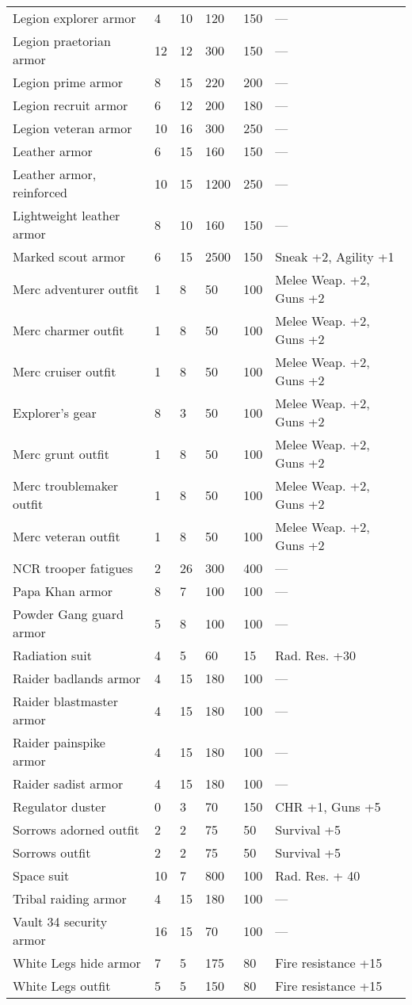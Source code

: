 \begin{longtable}{|p{4cm}|p{1.2cm}|p{1.2cm}|p{1.2cm}|p{1.2cm}|p{4cm}|}
Legion explorer armor  & 4 & 10 & 120 & 150 & —  \\
Legion praetorian armor  & 12 & 12 & 300 & 150 & —  \\
Legion prime armor  & 8 & 15 & 220 & 200 & —  \\
Legion recruit armor  & 6 & 12 & 200 & 180 & —  \\
Legion veteran armor  & 10 & 16 & 300 & 250 & —  \\
Leather armor  & 6 & 15 & 160 & 150 & —  \\
Leather armor, reinforced  & 10 & 15 & 1200 & 250 & —  \\
Lightweight leather armor  & 8 & 10 & 160 & 150 & —  \\
Marked scout armor  & 6 & 15 & 2500 & 150 & Sneak +2, Agility +1  \\
Merc adventurer outfit  & 1 & 8 & 50 & 100 & Melee Weap. +2, Guns +2  \\
Merc charmer outfit  & 1 & 8 & 50 & 100 & Melee Weap. +2, Guns +2  \\
Merc cruiser outfit  & 1 & 8 & 50 & 100 & Melee Weap. +2, Guns +2  \\
Explorer's gear  & 8 & 3 & 50 & 100 & Melee Weap. +2, Guns +2  \\
Merc grunt outfit  & 1 & 8 & 50 & 100 & Melee Weap. +2, Guns +2  \\
Merc troublemaker outfit  & 1 & 8 & 50 & 100 & Melee Weap. +2, Guns +2  \\
Merc veteran outfit  & 1 & 8 & 50 & 100 & Melee Weap. +2, Guns +2  \\
NCR trooper fatigues  & 2 & 26 & 300 & 400 & —  \\
Papa Khan armor  & 8 & 7 & 100 & 100 & —  \\
Powder Gang guard armor  & 5 & 8 & 100 & 100 & —  \\
Radiation suit  & 4 & 5 & 60 & 15 & Rad. Res. +30  \\
Raider badlands armor  & 4 & 15 & 180 & 100 & —  \\
Raider blastmaster armor  & 4 & 15 & 180 & 100 & —  \\
Raider painspike armor  & 4 & 15 & 180 & 100 & —  \\
Raider sadist armor  & 4 & 15 & 180 & 100 & —  \\
Regulator duster  & 0 & 3 & 70 & 150 & CHR +1, Guns +5  \\
Sorrows adorned outfit  & 2 & 2 & 75 & 50 & Survival +5  \\
Sorrows outfit  & 2 & 2 & 75 & 50 & Survival +5  \\
Space suit  & 10 & 7 & 800 & 100 & Rad. Res. + 40  \\
Tribal raiding armor  & 4 & 15 & 180 & 100 & —  \\
Vault 34 security armor  & 16 & 15 & 70 & 100 & —  \\
White Legs hide armor  & 7 & 5 & 175 & 80 & Fire resistance +15  \\
White Legs outfit  & 5 & 5 & 150 & 80 & Fire resistance +15  \\
\end{longtable}
